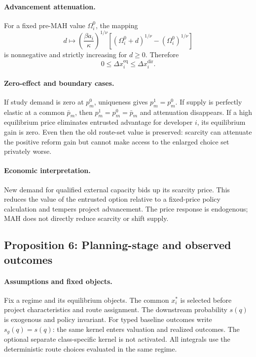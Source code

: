 \paragraph{Advancement attenuation.}
For a fixed pre-MAH value \(\Omega_i^0\), the mapping
\[
  d\longmapsto
  \left(\frac{\beta a_i}{\kappa}\right)^{1/\nu}
  [(\Omega_i^0+d)^{1/\nu}-(\Omega_i^0)^{1/\nu}]
\]
is nonnegative and strictly increasing for \(d\geq0\). Therefore
\begin{equation}
  0
  \leq
  \Delta x_i^{\mathrm{eq}}
  \leq
  \Delta x_i^{\mathrm{dir}}.
  \label{eq:p08-scarcity-advancement-bounds}
\end{equation}

\paragraph{Zero-effect and boundary cases.}
If study demand is zero at \(p_m^0\), uniqueness gives \(p_m^1=p_m^0\). If supply is
perfectly elastic at a common \(\bar p_m\), then
\(p_m^1=p_m^0=\bar p_m\) and attenuation disappears. If a high equilibrium
price eliminates entrusted advantage for developer \(i\), its equilibrium
gain is zero. Even then the old route-set value is preserved: scarcity can
attenuate the positive reform gain but cannot make access to the enlarged
choice set privately worse.

\paragraph{Economic interpretation.}
New demand for qualified external capacity bids up its scarcity price. This
reduces the value of the entrusted option relative to a fixed-price policy
calculation and tempers project advancement. The price response is endogenous;
MAH does not directly reduce scarcity or shift supply.

\subsection{Proposition 6: Planning-stage and observed outcomes}
\label{prop:p08-outcomes}

\paragraph{Assumptions and fixed objects.}
Fix a regime and its equilibrium objects. The common \(x_i^*\) is selected
before project characteristics and route assignment. The downstream
probability \(s(q)\) is exogenous and policy invariant. For typed baseline
outcomes write \(s_g(q)=s(q)\): the same kernel enters valuation and realized
outcomes. The optional separate class-specific kernel is not activated.
All integrals use the deterministic route choices evaluated in the same
regime.

